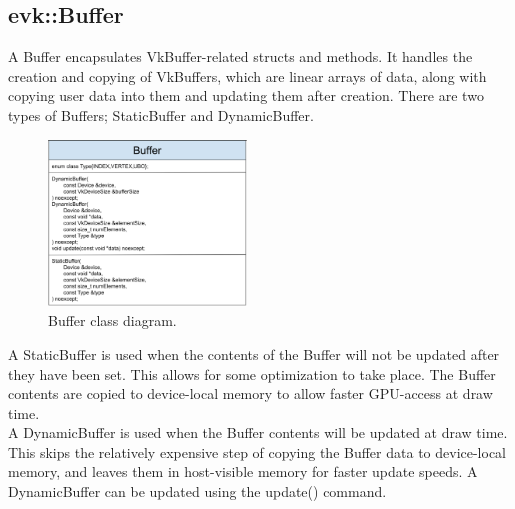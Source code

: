 \documentclass[12pt]{report}
\newcommand{\figurewidth}{0.55\textwidth}
\newcommand{\imagewidth}{0.47\textwidth}
\theoremstyle{definition}
\begin{document}
      \subsection{evk::Buffer}

        A Buffer encapsulates VkBuffer-related structs and methods. It handles
        the creation and copying of VkBuffers, which are linear arrays of
        data, along with copying user data into them and updating them after
        creation. There are two types of Buffers; StaticBuffer and
        DynamicBuffer. \\

        \begin{figure}
          \centering
          \includegraphics[width=\imagewidth]{images/class_buffer.png}
          \caption{Buffer class diagram.}
          \label{fig:class_buffer}  
        \end{figure}

        A StaticBuffer is used when the contents of the Buffer will not be
        updated after they have been set. This allows for some optimization
        to take place. The Buffer contents are copied to device-local memory
        to allow faster GPU-access at draw time. \\

        A DynamicBuffer is used when the Buffer contents will be updated at
        draw time. This skips the relatively expensive step of copying the
        Buffer data to device-local memory, and leaves them in host-visible
        memory for faster update speeds. A DynamicBuffer can be updated
        using the update() command.
\end{document}

